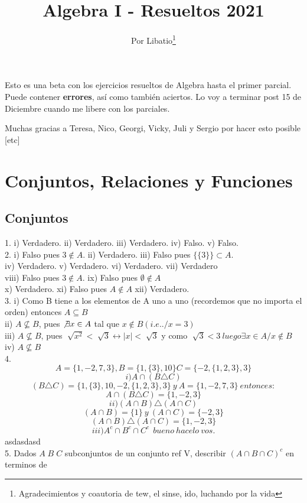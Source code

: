 \documentclass[10pt, a4paper]{book}
\title{Algebra I - Resueltos 2021}
\author{Por Libatio\thanks{Agradecimientos y coautoria de tew, el sinse, ido, luchando por la vida}
}
\begin{document}
\maketitle
Esto es una beta con los ejercicios resueltos de Algebra hasta el primer parcial. Puede contener \textbf{errores}, así como también aciertos. Lo voy a terminar post 15 de Diciembre cuando me libere con los parciales. 

Muchas gracias a Teresa, Nico, Georgi, Vicky, Juli y Sergio por hacer esto posible [etc]
\chapter{Conjuntos, Relaciones y Funciones}

\section{Conjuntos}
1. i) Verdadero. ii) Verdadero. iii) Verdadero. iv) Falso. v) Falso.\\
2. i) Falso pues \(3\not\in A\). ii) Verdadero. iii) Falso pues \(\lbrace\lbrace3\rbrace\rbrace\subset A\).\\
 iv) Verdadero. v) Verdadero. vi) Verdadero. vii) Verdadero \\
 viii) Falso pues \(3\notin A\). ix) Falso pues \(\emptyset \not\in A\) \\
 x) Verdadero. xi) Falso pues \(A \not\in A\) xii) Verdadero. \\
3.
i) Como B tiene a los elementos de A uno a uno (recordemos que no importa el orden) entonces \(A \subseteq B\)\\
ii) \(A \not \subseteq B\), pues \(\not\exists x \in A\) tal que \(x \not\in B (i.e. ./x = 3)\)\\
iii) \(A \not \subseteq B\), pues \(\sqrt[]{x^2}<\sqrt[]{3}\leftrightarrow |x|<\sqrt[]{3} \) y como \(\sqrt[]{3}<3 \ luego \exists x\in A / x \not\in B\)\\
iv) \(A \not \subseteq B\)\\
4. \[
A=\{1, -2, 7, 3\} , B=\{1, \{3\}, 10\} C=\{-2, \{1,2,3\}, 3\}
\]
\[i) A \cap (B \triangle C)\]
\[(B \triangle C) = \{1,\{3\}, 10, -2, \{1,2,3\},3\} \:y\: A=\{1, -2, 7, 3\}\:entonces: \]
\[A \cap (B \triangle C) = \{1, -2, 3\}\]
\[ii) (A \cap B) \triangle (A \cap C)\]
\[(A \cap B)=\{1\}\:y\:(A \cap C)=\{-2,3\}\]
\[(A \cap B) \triangle (A \cap C)=\{1,-2,3\}\]
\[iii) A^{c}\cap B^{c}\cap C^{c}\:\:bueno \:hacelo\: vos.\]
asdasdasd\\
5. Dados \(A\;B\;C\) subconjuntos de un conjunto ref V, describir \((A\cap B\cap C)^{c}\) en terminos de\\
\end{document}
